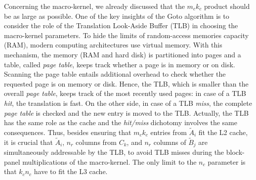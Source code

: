 %
Concerning the macro-kernel, we already discussed that the $m_c k_c$ product should be as large as possible. One of the key insights of the Goto algorithm is to consider the role of the Translation Look-Aside Buffer (TLB) in choosing the macro-kernel parameters. To hide the limits of random-access memories capacity (RAM), modern computing architectures use virtual memory. With this mechanism, the memory (RAM and hard disk) is partitioned into pages and a table, called \textit{page table}, keeps track whether a page is in memory or on disk. Scanning the page table entails additional overhead to check whether the requested page is on memory or disk.
Hence, the TLB, which is smaller than the overall \textit{page table}, keeps track of the most recently used pages: in case of a TLB \textit{hit}, the translation is fast. On the other side, in case of a TLB \emph{miss}, the complete \textit{page table} is checked and the new entry is moved to the TLB. Actually, the TLB has the same role as the cache and the \textit{hit/miss} dichotomy involves the same consequences. Thus, besides ensuring that $m_c k_c$ entries from $\tilde{A}_i$ fit the L2 cache, it is crucial that $\tilde{A}_i$, $n_r$ columns from $C_k$, and $n_r$ columns of $\tilde{B}_j$ are simultaneously addressable by the TLB, to avoid TLB misses during the block-panel multiplications of the macro-kernel. The only limit to the $n_c$ parameter is that $k_c n_c$ have to fit the L3 cache.

